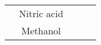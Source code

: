 \begin{landscape}
\begin{table}[]
\begin{tabular}{c|c|c|c|c}
                                                                                                 & Nitric acid                                                                                           &                                                                                                      &                                                                                              &                                                                                                                                                                                                                                                                                                                                                                                                                                                                                                                                                                                                                                                                                                                                                                                                                                                                                                                           \\
                                                                                                 & Methanol                                                                                              &                                                                                                      &                                                                                              &                                                                                                                                                                                                                                                                                                                                                                                                                                                                                                                                                                                                                                                                                                                                                                                                                                                                                                                           \\

\end{tabular}
\end{table}
\end{landscape}
